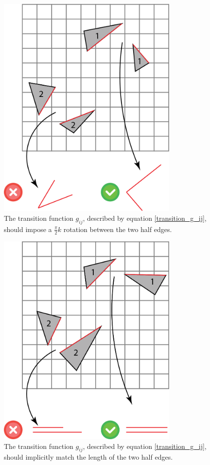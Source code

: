 \begin{figure}[ht]
\centering
\includegraphics[width=9cm]{figures/seamless/angle.png}
\caption[The Angle Requirement]{The transition function $g_{ij}$, described by equation \ref{transition_g_ij}, should impose a $\frac{\pi}{2}k$ rotation between the two half edges.}
\label{fig:angle_req}
\end{figure}

\begin{figure}[ht]
\centering
\includegraphics[width=9cm]{figures/seamless/length.png}
\caption[The Length Requirement]{The transition function $g_{ij}$, described by equation \ref{transition_g_ij}, should implicitly match the length of the two half edges.}
\label{fig:length_req}
\end{figure}

